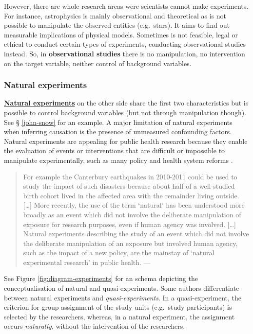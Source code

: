 \documentclass[
]{book}
\begin{document}
However, there are whole research areas were scientists cannot make experiments. For instance, astrophysics is mainly observational and theoretical as is not possible to manipulate the observed entities (e.g.~stars). It aims to find out measurable implications of physical models. Sometimes is not feasible, legal or ethical to conduct certain types of experiments, conducting observational studies instead. So, in \textbf{observational studies} there is no manipulation, no intervention on the target variable, neither control of background variables.

\hypertarget{natural-experiments}{%
\subsubsection{Natural experiments}\label{natural-experiments}}

\href{https://en.wikipedia.org/wiki/Natural_experiment}{\textbf{Natural experiments}} on the other side share the first two characteristics but is possible to control background variables (but not through manipulation though). See § \ref{john-snow} for an example. A major limitation of natural experiments when inferring causation is the presence of unmeasured confounding factors. Natural experiments are appealing for public health research because they enable the evaluation of events or interventions that are difficult or impossible to manipulate experimentally, such as many policy and health system reforms \citep{de2021conceptualising}.

\begin{quote}
For example the Canterbury earthquakes in 2010-2011 could be used to study the impact of such disasters because about half of a well-studied birth cohort lived in the affected area with the remainder living outside. {[}\ldots{]} More recently, the use of the term `natural' has been understood more broadly as an event which did not involve the deliberate manipulation of exposure for research purposes, even if human agency was involved. {[}\ldots{]} Natural experiments describing the study of an event which did not involve the deliberate manipulation of an exposure but involved human agency, such as the impact of a new policy, are the mainstay of `natural experimental research' in public health. --- \citep{de2021conceptualising}
\end{quote}

See Figure \ref{fig:diagram-experiments} for an schema depicting the conceptualisation of natural and quasi-experiments. Some authors differentiate between natural experiments and \emph{quasi-experiments}. In a quasi-experiment, the criterion for group assignment of the study units (e.g.~study participants) is selected by the researchers, whereas, in a natural experiment, the assignment occurs \emph{naturally}, without the intervention of the researchers.
\end{document}
